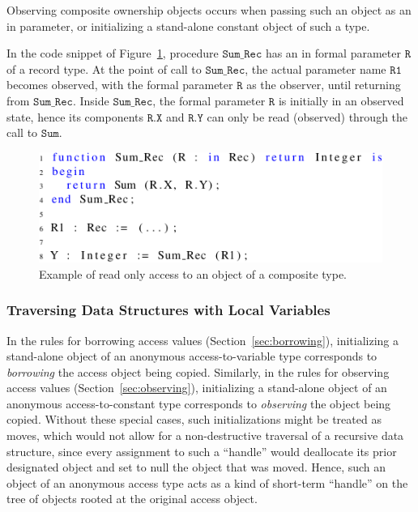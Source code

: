 \documentclass{llncs}
\newcommand\var[1]{\ensuremath{\mathtt{#1}}}
\newcommand{\keyword}[1]{\textsf{#1}}
\begin{document}
Observing composite ownership objects occurs when passing such an object as an \keyword{in} parameter, or initializing a stand-alone constant object of such a type.

In the code snippet of Figure~\ref{fig:observingComposite}, procedure \var{Sum\_Rec} has an \keyword{in} formal parameter \var{R} of a record type.
At the point of call to \var{Sum\_Rec}, the actual parameter name \var{R1} becomes observed, with the formal parameter \var{R} as the observer, until returning from \var{Sum\_Rec}. Inside \var{Sum\_Rec},
the formal parameter \var{R} is initially in an observed state, hence its components \var{R.X} and \var{R.Y} can only be read (observed) through the call to \var{Sum}.


\begin{figure}[htb!]
\centering
  \captionsetup{justification=centering,margin=0.6cm}
   \includegraphics[]{observingComposite}
   \caption{Example of read only access to an object of a composite type.}
   \label{fig:observingComposite}
\end{figure}


\subsubsection{Traversing Data Structures with Local Variables}

In the rules for borrowing access values (Section~\ref{sec:borrowing}), initializing a stand-alone object of an anonymous access-to-variable type corresponds to
\textit{borrowing} the access object being copied. Similarly, in the rules for observing access values (Section~\ref{sec:observing}), initializing a stand-alone object of an
anonymous access-to-constant type corresponds to \textit{observing} the object being copied. Without these special cases, such initializations might be treated as moves, which would not allow for a non-destructive
traversal of a recursive data structure, since every assignment to such a ``handle'' would
deallocate its prior designated object and set to null the object that was moved.  Hence, such an object of an anonymous access type acts as a kind of short-term ``handle'' on the tree of objects rooted at the original access object.
\end{document}

